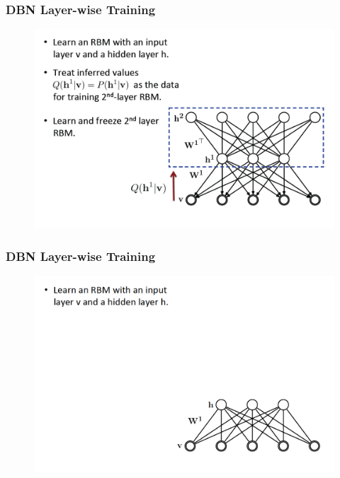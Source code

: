 \documentclass{beamer}
\begin{document}
\begin{frame}
\frametitle{DBN Layer-wise Training}
\begin{figure}
      \includegraphics[width=1\textwidth]{figs/rbm30.png}
\end{figure}
\end{frame}

\begin{frame}
\frametitle{DBN Layer-wise Training}
\begin{figure}
      \includegraphics[width=1\textwidth]{figs/rbm31.png}
\end{figure}
\end{frame}
\end{document}
